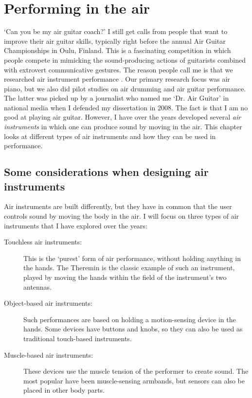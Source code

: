 \chapter{Performing in the air}\label{chap:touchless}

`Can you be my air guitar coach?' I still get calls from people that want to improve their air guitar skills, typically right before the annual Air Guitar Championships in Oulu, Finland. This is a fascinating competition in which people compete in mimicking the sound-producing actions of guitarists combined with extrovert communicative gestures. The reason people call me is that we researched air instrument performance \citep{godoy_playing_2006}. Our primary research focus was air piano, but we also did pilot studies on air drumming and air guitar performance. The latter was picked up by a journalist who named me `Dr. Air Guitar' in national media when I defended my dissertation in 2008. The fact is that I am no good at playing air guitar. However, I have over the years developed several \emph{air instruments} in which one can produce sound by moving in the air. This chapter looks at different types of air instruments and how they can be used in performance.


\section{Some considerations when designing air instruments}

Air instruments are built differently, but they have in common that the user controls sound by moving the body in the air. I will focus on three types of air instruments that I have explored over the years:

\begin{description}
	\item[Touchless air instruments:] This is the `purest' form of air performance, without holding anything in the hands. The Theremin is the classic example of such an instrument, played by moving the hands within the field of the instrument's two antennas.
  \item[Object-based air instruments:] Such performances are based on holding a motion-sensing device in the hands. Some devices have buttons and knobs, so they can also be used as traditional touch-based instruments.
  \item[Muscle-based air instruments:] These devices use the muscle tension of the performer to create sound. The most popular have been muscle-sensing armbands, but sensors can also be placed in other body parts.
\end{description}

